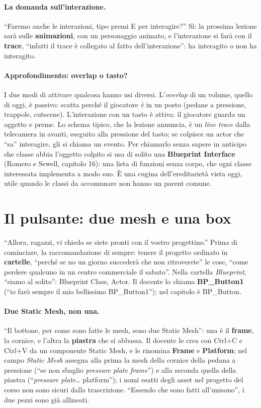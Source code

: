 \paragraph{La domanda sull'interazione.} ``Faremo anche le interazioni, tipo premi E per
interagire?'' Sì: la prossima lezione sarà sulle \textbf{animazioni}, con un personaggio
animato, e l'interazione si farà con il \textbf{trace}, ``infatti il trace è collegato
al fatto dell'interazione'': ha interagito o non ha interagito.

\paragraph{Approfondimento: overlap o tasto?} I due modi di attivare qualcosa hanno usi
diversi. L'\emph{overlap} di un volume, quello di oggi, è passivo: scatta perché il
giocatore \emph{è} in un posto (pedane a pressione, trappole, cutscene). L'interazione
con un tasto è attiva: il giocatore guarda un oggetto e preme. Lo schema tipico, che la
lezione annuncia, è un \emph{line trace} dalla telecamera in avanti, eseguito alla
pressione del tasto; se colpisce un actor che ``sa'' interagire, gli si chiama un evento.
Per chiamarlo senza sapere in anticipo che classe abbia l'oggetto colpito si usa di
solito una \textbf{Blueprint Interface} (Romero e Sewell, capitolo 16): una lista di
funzioni senza corpo, che ogni classe interessata implementa a modo suo. È una cugina
dell'ereditarietà vista oggi, utile quando le classi da accomunare non hanno un parent
comune.

\section{Il pulsante: due mesh e una box}
\label{ue7:sec:bottone}

``Allora, ragazzi, vi chiedo se siete pronti con il vostro progettino.'' Prima di
cominciare, la raccomandazione di sempre: tenere il progetto ordinato in
\textbf{cartelle}, ``perché se no un giorno succederà che non ritroverete'' le cose,
``come perdere qualcuno in un centro commerciale il sabato''. Nella cartella
\emph{Blueprint}, ``siamo al solito'': Blueprint Class, Actor. Il docente lo chiama
\textbf{BP\_Button1} (``io farò sempre il mio bellissimo BP\_Button1''); nel capitolo è
BP\_Button.

\paragraph{Due Static Mesh, non una.} ``Il bottone, per come sono fatte le mesh, sono due
Static Mesh'': una è il \textbf{frame}, la cornice, e l'altra la \textbf{piastra} che si
abbassa. Il docente le crea con Ctrl+C e Ctrl+V da un componente Static Mesh, e le
rinomina \textbf{Frame} e \textbf{Platform}; nel campo \emph{Static Mesh} assegna alla
prima la mesh della cornice della pedana a pressione (``se non sbaglio \emph{pressure
plate frame}'') e alla seconda quella della piastra (``\emph{pressure plate}\ldots{}
platform''); i nomi esatti degli asset nel progetto del corso non sono sicuri dalla
trascrizione. ``Essendo che sono fatti all'unisono'', i due pezzi sono già allineati.

